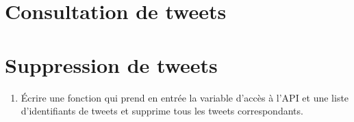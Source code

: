 \documentclass[11pt,a4paper]{article}
\begin{document}
\section{Consultation de tweets}

\begin{enumerate}


\end{enumerate}


    
    






\section{Suppression de tweets}

\begin{enumerate}
    \item Écrire une fonction qui prend en entrée la variable d'accès à l'API et une liste d'identifiants de tweets et supprime tous les tweets correspondants.
\end{enumerate}
\end{document}
